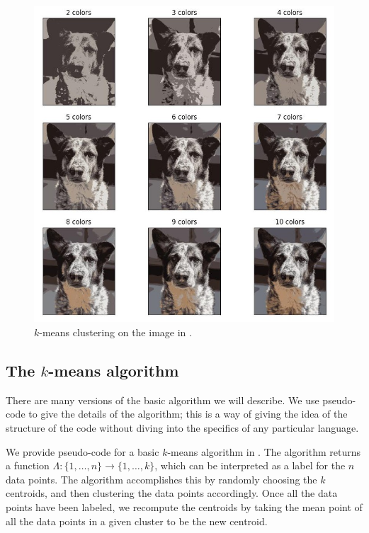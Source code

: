 \documentclass[a4paper, 12pt]{article}
\numberwithin{equation}{section}
\numberwithin{figure}{section}
\theoremstyle{definition}
\begin{document}
\begin{figure}[h]
	\centering
	\includegraphics[scale=0.75]{graphics/k_means_Sherlocks.jpg}
	\caption{$k$-means clustering on the image in .}
	\label{fig:k-means-sherlock}
\end{figure}

\subsection{The $k$-means algorithm}

There are many versions of the basic algorithm we will describe. We use
pseudo-code to give the details of the algorithm; this is a way of giving the
idea of the structure of the code without diving into the specifics of any
particular language. 

We provide pseudo-code for a basic $k$-means algorithm in .
The algorithm returns a function $\Lambda : \{1,\dots, n\} \to \{1,\dots, k\}$,
which can be interpreted as a label for the $n$ data points. The algorithm
accomplishes this by randomly choosing the $k$ centroids, and then clustering
the data points accordingly. Once all the data points have been labeled, we
recompute the centroids by taking the mean point of all the data points in a
given cluster to be the new centroid. 
\end{document}
